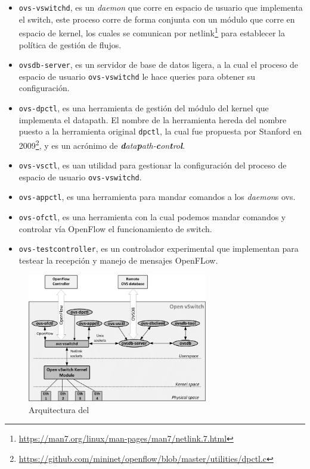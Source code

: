 \begin{itemize}
    \item \texttt{ovs-vswitchd}, es un \textit{daemon} que corre en espacio de usuario que implementa el switch, este proceso corre de forma conjunta con un módulo que corre en espacio de kernel, los cuales se comunican por netlink\footnote{\url{https://man7.org/linux/man-pages/man7/netlink.7.html}} para establecer la política de gestión de flujos.
    \item \texttt{ovsdb-server}, es un servidor de base de datos ligera, a la cual el proceso de espacio de usuario \texttt{ovs-vswitchd} le hace queries para obtener su configuración.
    \item \texttt{ovs-dpctl}, es una herramienta de gestión del módulo del kernel que implementa el datapath. El nombre de la herramienta hereda del nombre puesto a la herramienta original \texttt{dpctl}, la cual fue propuesta por Stanford en 2009\footnote{\url{https://github.com/mininet/openflow/blob/master/utilities/dpctl.c}}, y es un acrónimo de \textit{\textbf{d}ata\textbf{p}ath-\textbf{c}on\textbf{t}ro\textbf{l}}.
    \item \texttt{ovs-vsctl}, es uan utilidad para gestionar la configuración del proceso de espacio de usuario \texttt{ovs-vswitchd}.
    \item \texttt{ovs-appctl}, es una herramienta para mandar comandos a los \textit{daemon}s \gls{ovs}.
    \item \texttt{ovs-ofctl}, es una herramienta con la cual podemos mandar comandos y controlar vía OpenFlow el funcionamiento de switch.
    \item \texttt{ovs-testcontroller}, es un controlador experimental que implementan para testear la recepción y manejo de mensajes OpenFLow.
\end{itemize}

\begin{figure}[ht]
    \centering
    \includegraphics[width=0.7\textwidth]{archivos/img/teoria/ovs.png}
    \caption{Arquitectura del  \cite{mendiola2016survey}}
    \label{fig:ovs}
\end{figure}

